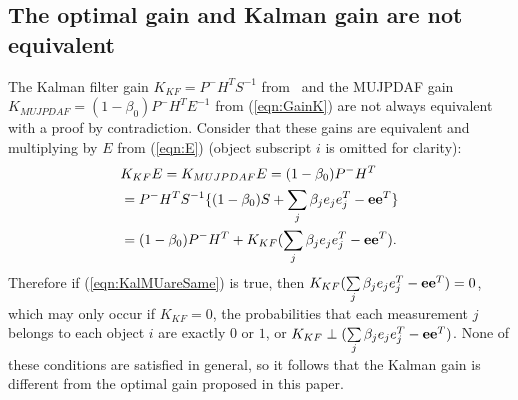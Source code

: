 \documentclass[letterpaper, 10pt, conference]{ieeeconf}
\newcommand{\refeqn}[1]{(\ref{eqn:#1})}
\begin{document}
\begin{appendix}
\subsection{The optimal gain and Kalman gain are not equivalent}
The Kalman filter gain $K_{KF}=P^-H^TS^{-1}$ from~\cite{TrackDataAssoc} and the MUJPDAF gain $K_{MUJPDAF}=(1-\beta_{0})P^-H^TE^{-1}$ from \refeqn{GainK} are not always equivalent with a proof by contradiction. Consider that these gains are equivalent and multiplying by $E$ from \refeqn{E} (object subscript $i$ is omitted for clarity):
\begin{align}
&K_{KF}E=K_{MUJPDAF}E=(1-\beta_{0})P^-H^T\nonumber
\\
&=P^-H^TS^{-1}\{(1-\beta_{0})S+{\sum\limits_{j} \beta_{j}e_{j}e_{j}^T-{\bf{e}}}{\bf{e}}^T\}\nonumber
\\
&=(1-\beta_{0})P^-H^T+K_{KF}({\sum\limits_{j} \beta_{j}e_{j}e_{j}^T-{\bf{e}}}{\bf{e}}^T).\label{eqn:KalMUareSame}
\end{align}
Therefore if \refeqn{KalMUareSame} is true, then $K_{KF}({\sum\limits_{j} \beta_{j}e_{j}e_{j}^T-{\bf{e}}}{\bf{e}}^T)=0$, which
may only occur if $K_{KF}=0$, the probabilities that each measurement $j$ belongs to each object $i$ are exactly $0$ or $1$, or $K_{KF}\perp({\sum\limits_{j} \beta_{j}e_{j}e_{j}^T-{\bf{e}}}{\bf{e}}^T)$. None of these conditions are satisfied in general, so it follows that the Kalman gain is different from the optimal gain proposed in this paper.

\end{appendix}




\end{document}
